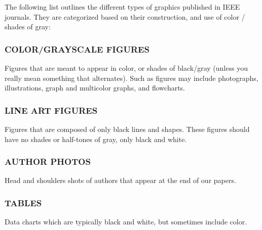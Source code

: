 \documentclass{IEEEjmw}
\begin{document}
The following list outlines the different types of graphics published in IEEE journals. They are categorized based on their construction, and use of color / shades of gray:

\subsubsection{COLOR/GRAYSCALE FIGURES}
Figures  that  are  meant  to  appear  in  color,  or  shades  of black/gray (unless   you   really   mean   something   that alternates).  Such as figures  may  include  photographs, illustrations, graph and multicolor graphs, and flowcharts.


\subsubsection{LINE ART FIGURES}

Figures that are composed of only black lines and shapes. These figures should have no shades or half-tones of gray, 
only black and white.

\subsubsection{AUTHOR PHOTOS}

Head and shoulders shots of authors that appear at the end of our papers.

\subsubsection{TABLES}
Data charts which are typically black and white, but sometimes include color.
\end{document}
